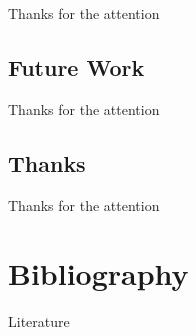 \documentclass[compress]{beamer}
\begin{document}
\begin{frame}
\begin{center}
\huge
Thanks for the attention
\end{center}
\end{frame}

\subsection{Future Work}

\begin{frame}
\begin{center}
\huge
Thanks for the attention
\end{center}
\end{frame}

\subsection{Thanks}

\begin{frame}
\begin{center}
\huge
Thanks for the attention
\end{center}
\end{frame}

\appendix
{}


\section{Bibliography}
\begin{frame}[allowframebreaks]{Literature}


\end{frame}


\end{document}
